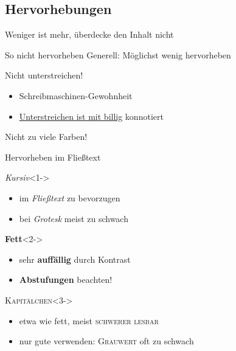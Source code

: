 \documentclass[ngerman,draft, usepdftitle=true]{beamer}
\begin{document}
\subsection{Hervorhebungen}
\begin{frame}
  \subsectionpage
  \centering
  Weniger ist mehr, überdecke den Inhalt nicht
\end{frame}

\begin{frame}{So nicht hervorheben}
  \alert{Generell:} Möglichst wenig hervorheben
  \begin{alertblock}{Nicht unterstreichen!}
    \begin{itemize}
    \item Schreibmaschinen-Gewohnheit
    \item \underline{Unterstreichen ist mit billig} konnotiert
    \end{itemize}
  \end{alertblock}
  \begin{alertblock}{Nicht zu viele Farben!}
    \fontsize{14pt}{18pt}\selectfont
  \end{alertblock}
\end{frame}

\begin{frame}[t]{Hervorheben im Fließtext}  
  \begin{block}{\itshape Kursiv}<1->
    \begin{itemize}
    \item im \textit{Fließtext} zu bevorzugen
    \item bei \textit{Grotesk} meist zu schwach
    \end{itemize}
  \end{block}
  \begin{block}{\bfseries Fett}<2->
    \begin{itemize}
    \item sehr \textbf{auffällig} durch Kontrast
    \item \textbf{Abstufungen} beachten!
    \end{itemize}
  \end{block}
  \begin{block}{\scshape Kapitälchen}<3->
    \begin{itemize}
    \item etwa wie fett, meist \textsc{schwerer lesbar}
    \item nur gute verwenden: \textsc{Grauwert} oft zu schwach
    \end{itemize}
  \end{block}
\end{frame}
\end{document}
